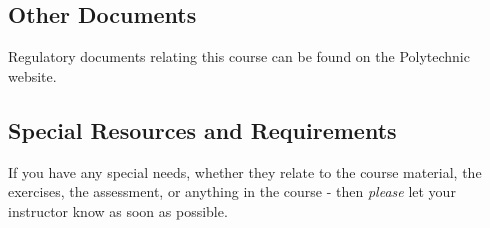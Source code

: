 \documentclass{article}
\begin{document}
\subsection*{Other Documents}
Regulatory documents relating this course can be found on the Polytechnic website.

\subsection*{Special Resources and Requirements}
If you have any special needs, whether they relate to the course material, the exercises, the assessment, or anything in the course -
then \textit{please} let your instructor know as soon as possible.
\end{document}
